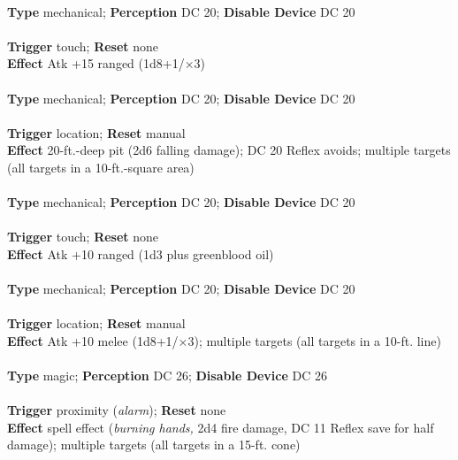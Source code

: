 
\\
\textbf{Type }mechanical; \textbf{Perception} DC 20; \textbf{Disable Device} DC 20\\
\\
\textbf{Trigger} touch; \textbf{Reset} none\\
\textbf{Effect }Atk +15 ranged (1d8+1/×3)\\

\\
\textbf{Type }mechanical; \textbf{Perception} DC 20; \textbf{Disable Device} DC 20\\
\\
\textbf{Trigger} location; \textbf{Reset} manual\\
\textbf{Effect }20-ft.-deep pit (2d6 falling damage); DC 20 Reflex avoids; multiple targets (all targets in a 10-ft.-square area)\\

\\
\textbf{Type }mechanical; \textbf{Perception} DC 20; \textbf{Disable Device} DC 20\\
\\
\textbf{Trigger} touch; \textbf{Reset} none\\
\textbf{Effect }Atk +10 ranged (1d3 plus greenblood oil)\\

\\
\textbf{Type }mechanical; \textbf{Perception} DC 20; \textbf{Disable Device} DC 20\\
\\
\textbf{Trigger} location; \textbf{Reset} manual\\
\textbf{Effect }Atk +10 melee (1d8+1/×3); multiple targets (all targets in a 10-ft. line)\\

\\
\textbf{Type }magic; \textbf{Perception} DC 26; \textbf{Disable Device} DC 26\\
\\
\textbf{Trigger} proximity (\textit{alarm}); \textbf{Reset} none\\
\textbf{Effect }spell effect (\textit{burning hands, }2d4 fire damage, DC 11 Reflex save for half damage); multiple targets (all targets in a 15-ft. cone)\\

